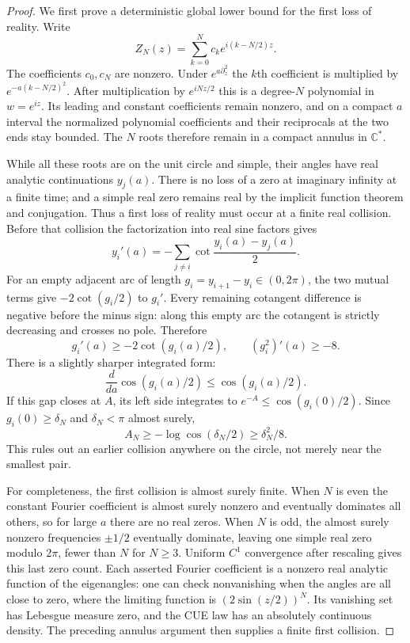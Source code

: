 \begin{proof}
We first prove a deterministic global lower bound for
the first loss of reality. Write
\[
 Z_N(z)=\sum_{k=0}^Nc_ke^{i(k-N/2)z}.
\]
The coefficients $c_0,c_N$ are nonzero. Under
$e^{a\partial_z^2}$ the $k$th coefficient is multiplied
by $e^{-a(k-N/2)^2}$. After multiplication by
$e^{iNz/2}$ this is a degree-$N$ polynomial in $w=e^{iz}$.
Its leading and constant coefficients remain nonzero,
and on a compact $a$ interval the normalized polynomial
coefficients and their reciprocals at the two ends stay
bounded. The $N$ roots therefore remain in a compact
annulus in $\mathbb C^*$.

While all these roots are on the unit circle and simple,
their angles have real analytic continuations $y_j(a)$.
There is no loss of a zero at imaginary infinity at a
finite time; and a simple real zero remains real by the
implicit function theorem and conjugation. Thus a first
loss of reality must occur at a finite real collision.
Before that collision the factorization into real sine
factors gives
\begin{equation}\label{eq:analytic-circular-backward-ode}
 y_i'(a)=-\sum_{j\ne i}\cot\frac{y_i(a)-y_j(a)}2.
\end{equation}
For an empty adjacent arc of length
$g_i=y_{i+1}-y_i\in(0,2\pi)$, the two mutual terms give
$-2\cot(g_i/2)$ to $g_i'$. Every remaining cotangent
difference is negative before the minus sign: along
this empty arc the cotangent is strictly decreasing
and crosses no pole. Therefore
\[
                  g_i'(a)\ge-2\cot(g_i(a)/2),
                  \qquad (g_i^2)'(a)\ge-8.
\]
There is a slightly sharper integrated form:
\[
       \frac d{da}\cos(g_i(a)/2)
                       \le\cos(g_i(a)/2).
\]
If this gap closes at $A$, its left side integrates to
$e^{-A}\le\cos(g_i(0)/2)$. Since
$g_i(0)\ge\delta_N$ and $\delta_N<\pi$ almost surely,
\begin{equation}\label{eq:analytic-first-time-lower}
       A_N\ge-\log\cos(\delta_N/2)\ge\delta_N^2/8.
\end{equation}
This rules out an earlier collision anywhere on the
circle, not merely near the smallest pair.

For completeness, the first collision is almost surely
finite. When $N$ is even the constant Fourier coefficient
is almost surely nonzero and eventually dominates all
others, so for large $a$ there are no real zeros.
When $N$ is odd, the almost surely nonzero frequencies
$\pm1/2$ eventually dominate, leaving one simple real
zero modulo $2\pi$, fewer than $N$ for $N\ge3$.
Uniform $C^1$ convergence after rescaling gives this
last zero count. Each asserted Fourier coefficient is
a nonzero real analytic function of the eigenangles:
one can check nonvanishing when the angles are all
close to zero, where the limiting function is
$(2\sin(z/2))^N$. Its vanishing set has Lebesgue
measure zero, and the CUE law has an absolutely
continuous density. The preceding annulus argument
then supplies a finite first collision.


\end{proof}
